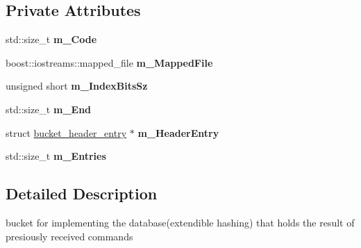 \subsection*{Private Attributes}
\begin{DoxyCompactItemize}
\item 
\hypertarget{classresultsDB_1_1cResultsBucket_a018ded0e19c66afe11a857e02ae1720d}{std\-::size\-\_\-t {\bfseries m\-\_\-\-Code}}\label{classresultsDB_1_1cResultsBucket_a018ded0e19c66afe11a857e02ae1720d}

\item 
\hypertarget{classresultsDB_1_1cResultsBucket_ac509595a30d4e9423c5f8f71c34b5713}{boost\-::iostreams\-::mapped\-\_\-file {\bfseries m\-\_\-\-Mapped\-File}}\label{classresultsDB_1_1cResultsBucket_ac509595a30d4e9423c5f8f71c34b5713}

\item 
\hypertarget{classresultsDB_1_1cResultsBucket_a2ae295fcd93a98f9c80b6d96e336a9d6}{unsigned short {\bfseries m\-\_\-\-Index\-Bits\-Sz}}\label{classresultsDB_1_1cResultsBucket_a2ae295fcd93a98f9c80b6d96e336a9d6}

\item 
\hypertarget{classresultsDB_1_1cResultsBucket_aaea6a88e08d0601845161aad02dc7c7b}{std\-::size\-\_\-t {\bfseries m\-\_\-\-End}}\label{classresultsDB_1_1cResultsBucket_aaea6a88e08d0601845161aad02dc7c7b}

\item 
\hypertarget{classresultsDB_1_1cResultsBucket_a42d5201e7159db580e9ca8c459df97e9}{struct \hyperlink{structresultsDB_1_1cResultsBucket_1_1bucket__header__entry}{bucket\-\_\-header\-\_\-entry} $\ast$ {\bfseries m\-\_\-\-Header\-Entry}}\label{classresultsDB_1_1cResultsBucket_a42d5201e7159db580e9ca8c459df97e9}

\item 
\hypertarget{classresultsDB_1_1cResultsBucket_aef2a7bf395f5d6a760934f849a89b023}{std\-::size\-\_\-t {\bfseries m\-\_\-\-Entries}}\label{classresultsDB_1_1cResultsBucket_aef2a7bf395f5d6a760934f849a89b023}

\end{DoxyCompactItemize}


\subsection{Detailed Description}
bucket for implementing the database(extendible hashing) that holds the result of presiously received commands 

